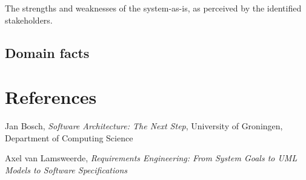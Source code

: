 The strengths and weaknesses of the system-as-is, as perceived by the identified stakeholders.

\section{Domain facts}


\chapter{References}

\begin{thebibliography}{9}
	
	Jan Bosch,
	\emph{Software Architecture: The Next Step},
	University of Groningen, Department of Computing Science
	
	Axel van Lamsweerde,
	\emph{Requirements Engineering: From System Goals to UML Models to Software Specifications}
	
	
\end{thebibliography}


\appendix



